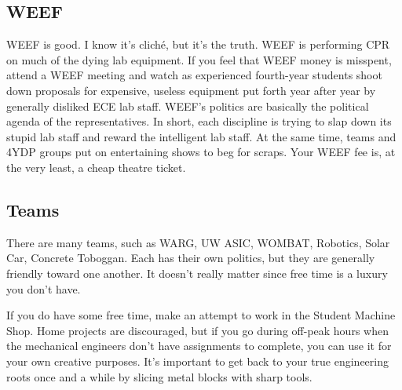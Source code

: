 \documentclass{book}
\begin{document}
\subsection{WEEF}
WEEF is good. I know it's clich\'e, but it's the truth. WEEF is performing CPR on much of the dying lab equipment. If you feel that WEEF money is misspent, attend a WEEF meeting and watch as experienced fourth-year students shoot down proposals for expensive, useless equipment put forth year after year by generally disliked ECE lab staff. WEEF's politics are basically the political agenda of the representatives. In short, each discipline is trying to slap down its stupid lab staff and reward the intelligent lab staff. At the same time, teams and 4YDP groups put on entertaining shows to beg for scraps. Your WEEF fee is, at the very least, a cheap theatre ticket.

\subsection{Teams}
There are many teams, such as WARG, UW ASIC, WOMBAT, Robotics, Solar Car, Concrete Toboggan. Each has their own politics, but they are generally friendly toward one another. It doesn't really matter since free time is a luxury you don't have.

If you do have some free time, make an attempt to work in the Student Machine Shop. Home projects are discouraged, but if you go during off-peak hours when the mechanical engineers don't have assignments to complete, you can use it for your own creative purposes. It's important to get back to your true engineering roots once and a while by slicing metal blocks with sharp tools.
\end{document}
